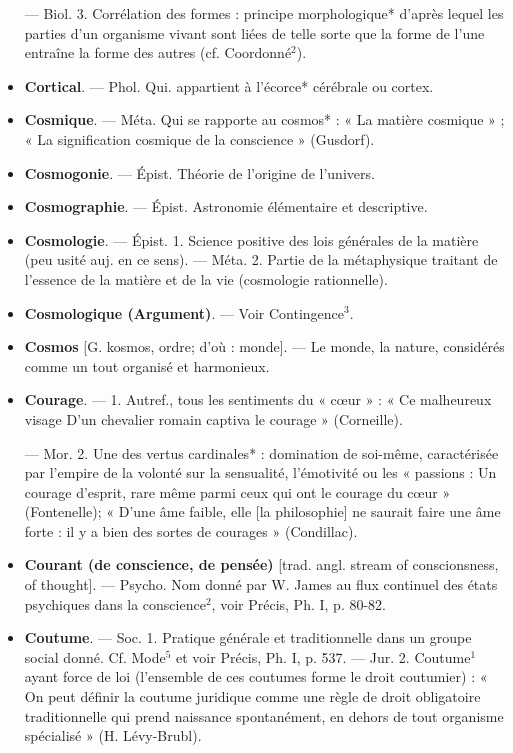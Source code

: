 \begin{itemize}[leftmargin=1cm, label=, itemsep=11pt]
— Biol. 3. Corrélation des formes :
principe morphologique* d’après lequel les parties d’un organisme
vivant sont liées de telle sorte que
la forme de l'une entraîne la forme
des autres (cf. Coordonné$^2$).

\item {\bf Cortical}. — Phol. Qui. appartient à
l’écorce* cérébrale ou cortex.

\item {\bf Cosmique}. — Méta. Qui se rapporte au
cosmos* : « La matière cosmique » ;
« La signification cosmique de la
conscience » (Gusdorf).

\item {\bf Cosmogonie}. — Épist. Théorie de
l’origine de l'univers.

\item {\bf Cosmographie}. — Épist. Astronomie
élémentaire et descriptive.

\item {\bf Cosmologie}. — Épist. 1. Science positive des lois générales de la matière
(peu usité auj. en ce sens). — Méta.
2. Partie de la métaphysique traitant de l’essence de la matière et de
la vie (cosmologie rationnelle).

\item {\bf Cosmologique (Argument)}. — Voir
Contingence$^3$.

\item {\bf Cosmos} [G. kosmos, ordre; d'où :
monde]. — Le monde, la nature,
considérés comme un tout organisé
et harmonieux.

\item {\bf Courage}. — 1. Autref., tous les sentiments du « cœur » : « Ce malheureux
visage D'un chevalier romain captiva
le courage » (Corneille).

— Mor. 2. Une des vertus cardinales* : domination de soi-même,
caractérisée par l'empire de la volonté sur la sensualité, l'émotivité
ou les « passions : Un courage d’esprit, rare même parmi ceux qui ont
le courage du cœur » (Fontenelle);
« D'une âme faible, elle [la philosophie] ne saurait faire une âme
forte : il y a bien des sortes de courages » (Condillac).

\item {\bf Courant (de conscience, de pensée)}
[trad. angl. stream of conscionsness,
of thought]. — Psycho. Nom donné
par W. James au flux continuel des
états psychiques dans la conscience$^2$,
voir Précis, Ph. I, p. 80-82.

\item {\bf Coutume}. — Soc. 1. Pratique générale
et traditionnelle dans un groupe
social donné. Cf. Mode$^5$ et voir
Précis, Ph. I, p. 537. — Jur. 2. Coutume$^1$ ayant force de loi (l’ensemble
de ces coutumes forme le droit coutumier) : « On peut définir la coutume juridique comme une règle de
droit obligatoire traditionnelle qui
prend naissance spontanément, en
dehors de tout organisme spécialisé » (H. Lévy-Brubl).


\end{itemize}
